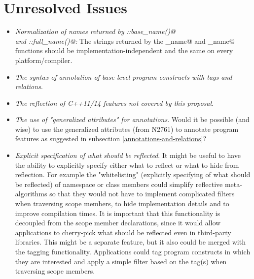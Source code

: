\section{Unresolved Issues}
\label{section-issues}

\begin{itemize}
	\item {\em Normalization of names returned by \verb@Named::base_name()@\\and \verb@NamedScoped::full_name()@:}
	The strings returned by the \verb@base_name@ and \verb@full_name@ functions should be
	implementation-independent and the same on every platform/compiler.

	\item {\em The syntax of annotation of base-level program constructs with tags and relations}.

	\item {\em The reflection of C++11/14 features not covered by this proposal}.

	\item {\em The use of "generalized attributes" for annotations}. Would it be possible
	(and wise) to use the generalized attributes (from N2761) to annotate program features
	as suggested in subsection \ref{annotations-and-relations}?

	\item {\em Explicit specification of what should be reflected}. It might be useful to have
	the ability to explicitly specify either what to reflect or what to hide from reflection.
	For example the "whitelisting" (explicitly specifying of what should be reflected) of namespace
	or class members could simplify reflective meta-algorithms so that they would not have
	to implement complicated filters when traversing scope members, to hide implementation details and
	to improve compilation times. It is important that this functionality is decoupled from the
	scope member declarations, since it would allow applications to cherry-pick what should be
	reflected even in third-party libraries.
	This might be a separate feature, but it also could be merged with the tagging functionality.
	Applications could tag program constructs in which they are interested and apply a simple
	filter based on the tag(s) when traversing scope members.
\end{itemize}
